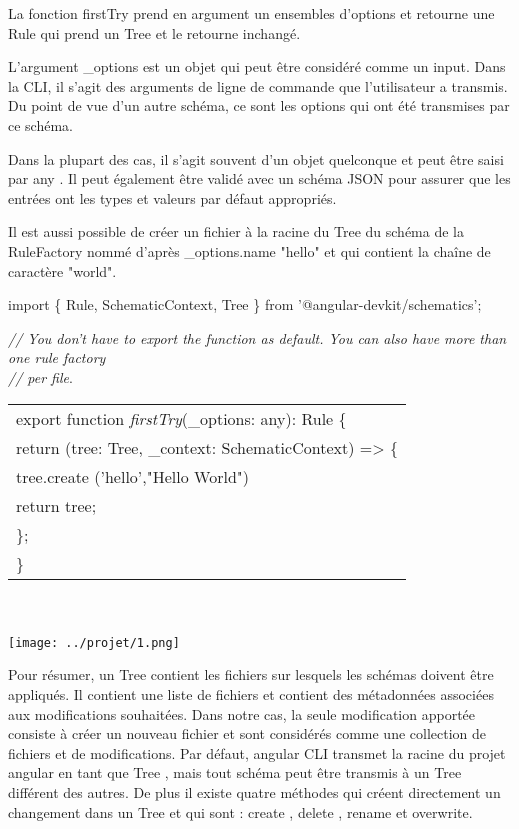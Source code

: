 \documentclass[12pt,french]{article}
\begin{document}
	La fonction firstTry prend en argument un ensembles d'options et retourne une Rule qui prend un Tree et le retourne inchangé.\newline
	
	L'argument \_options est un objet qui peut être considéré comme un input. Dans la CLI, il s'agit des arguments de ligne de commande que l'utilisateur a transmis. Du point de vue d'un autre schéma, ce sont les options qui ont été transmises par ce schéma.\newline
	
	Dans la plupart des cas, il s’agit souvent d’un objet quelconque et peut être saisi par any . Il peut également être validé avec un schéma JSON pour assurer que les entrées ont les types et valeurs par défaut appropriés.\newline
	
	Il est aussi possible de créer un fichier à la racine du Tree du schéma de la RuleFactory nommé d'après \_options.name "hello" et qui contient la chaîne de caractère "world". \newline
	
	import \{ Rule, SchematicContext, Tree \} from '@angular-devkit/schematics';\newline
	
	\textit{// You don't have to export the function as default. You can also have more than one rule factory}\\
	\textit{// per file}.
\newline
	
		\begin{tabular}{l}
		export function \textit{firstTry}(\_options: any): Rule \{ \\
			\quad return (tree: Tree, \_context: SchematicContext) => \{ \\
				\qquad tree.create ('hello',"Hello World")\\
				\qquad return tree;\\
			\quad\};
\\
		\}
	\end{tabular}\break\\
	\\
	\texttt{[image: ../projet/1.png]} 

	Pour résumer, un Tree contient les fichiers sur lesquels les schémas doivent être appliqués. Il contient une liste de fichiers et contient des métadonnées associées aux modifications souhaitées. Dans notre cas, la seule modification apportée consiste à créer un nouveau fichier et sont considérés comme une collection de fichiers et de modifications.\newline
	Par défaut, angular CLI transmet la racine du projet angular en tant que Tree , mais tout schéma peut être transmis à un Tree différent des autres. De plus il existe quatre méthodes qui créent directement un changement dans un Tree et qui sont : create , delete , rename et overwrite.\newline
	
\end{document}

